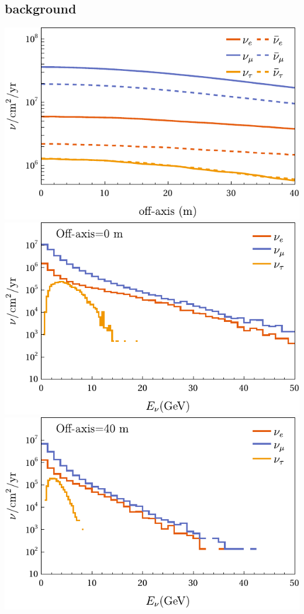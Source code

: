 \documentclass[aps,prd,twocolumn,superscriptaddress,amsmath,amssymb]{revtex4}
\newcommand{\lw}{\linewidth}
\begin{document}
\subsection{background}
\noindent
\includegraphics[width=\lw]{plots/meeting/meta.pdf}
\includegraphics[width=\lw]{plots/meeting/energy-0.pdf}
\includegraphics[width=\lw]{plots/meeting/energy-40.pdf}
\end{document}
